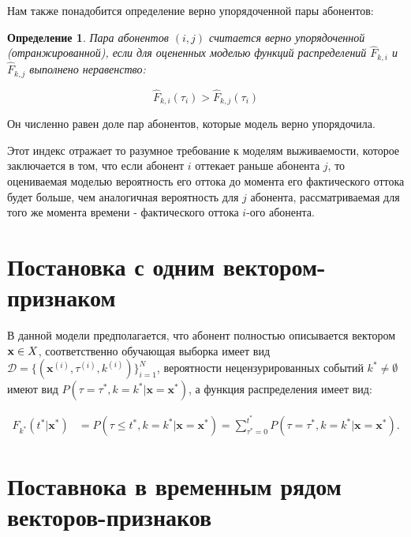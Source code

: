 \documentclass[a4paper,14pt,oneside,openany]{memoir}
\newtheorem{definition}{Определение}
\begin{document}
Нам также понадобится определение верно упорядоченной пары абонентов: 

\begin{definition}
Пара абонентов $(i,j)$ считается верно упорядоченной (отранжированной), если для оцененных моделью функций распределений $\hat{F}_{k,i}$ и $\hat{F}_{k,j}$ выполнено неравенство: 

$$ \hat{F}_{k,i}(\tau_i ) >  \hat{F}_{k,j}(\tau_i ) $$ 
\end{definition}





 Он численно равен доле пар абонентов, которые модель верно упорядочила. 

Этот индекс отражает то разумное требование к моделям выживаемости, которое заключается в том, что если абонент $i$ оттекает раньше абонента $j$, то оцениваемая моделью вероятность его оттока до момента его фактического оттока будет больше, чем аналогичная вероятность для $j$ абонента, рассматриваемая для того же момента времени - фактического оттока $i$-ого абонента. 

\section{Постановка с одним вектором-признаком}

В данной модели предполагается, что абонент полностью описывается вектором $\bold{x} \in X$, соответственно обучающая выборка имеет вид $\mathcal{D}=\{(\mathbf{x}^{(i)},\tau^{(i)},k^{(i)})\}_{i=1}^N$, вероятности нецензурированных событий $k^* \neq \emptyset $ имеют вид $P(\tau=\tau^*,k=k^*|\mathbf{x}=\mathbf{x}^*)$, а функция распределения имеет вид:

\begin{align}
	F_{k^*}(t^*|\mathbf{x}^*) &= P(\tau\leq t^*,k=k^*|\mathbf{x}=\mathbf{x}^*) 
	= \sum_{\tau^*=0}^{t^*} P(\tau=\tau^*,k=k^*|\mathbf{x}=\mathbf{x}^*).
\end{align}




\section{Поставнока в временным рядом векторов-признаков}
\end{document}
